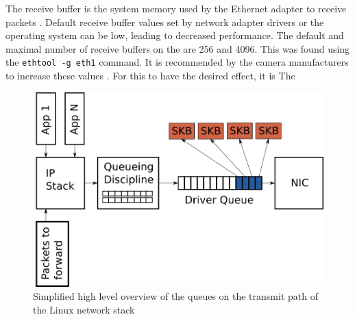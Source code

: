 The receive buffer is the system memory used by the Ethernet adapter to receive packets \cite{lucidvisionlabsReceiveBuffers2020}.
Default receive buffer values set by network adapter drivers or the operating system can be low, leading to decreased performance.
The default and maximal number of receive buffers on the \jx are 256 and 4096.
This was found using the \texttt{ethtool -g eth1} command.
It is recommended by the camera manufacturers to increase these values \cite{lucidvisionlabsReceiveBuffers2020}.
For this to have the desired effect, it is
The
\begin{figure}
    \centering
    \includegraphics[width=\textwidth]{figures/linux_networking.png}
    \caption{Simplified high level overview of the queues on the transmit path of the Linux network stack \cite{danQueueingLinuxNetwork2013}}
    \label{fig:linux_network}
\end{figure}

